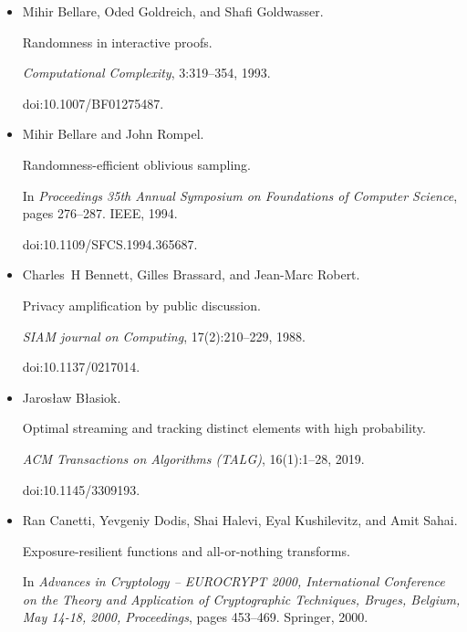 \documentclass[10pt,a4paper]{article}
\begin{document}
\begin{itemize}
\item[] 
[5]

Mihir Bellare, Oded Goldreich, and Shafi Goldwasser.


Randomness in interactive proofs.


\emph{Computational Complexity}, 3:319–354, 1993.


doi:10.1007/BF01275487.





\item[] 
[6]

Mihir Bellare and John Rompel.


Randomness-efficient oblivious sampling.


In \emph{Proceedings 35th Annual Symposium on Foundations of Computer
Science}, pages 276–287. IEEE, 1994.


doi:10.1109/SFCS.1994.365687.





\item[] 
[7]

Charles H Bennett, Gilles Brassard, and Jean-Marc Robert.


Privacy amplification by public discussion.


\emph{SIAM journal on Computing}, 17(2):210–229, 1988.


doi:10.1137/0217014.





\item[] 
[8]

Jarosław Błasiok.


Optimal streaming and tracking distinct elements with high
probability.


\emph{ACM Transactions on Algorithms (TALG)}, 16(1):1–28, 2019.


doi:10.1145/3309193.





\item[] 
[9]

Ran Canetti, Yevgeniy Dodis, Shai Halevi, Eyal Kushilevitz, and Amit Sahai.


Exposure-resilient functions and all-or-nothing transforms.


In \emph{Advances in Cryptology – EUROCRYPT 2000, International
Conference on the Theory and Application of Cryptographic Techniques, Bruges,
Belgium, May 14-18, 2000, Proceedings}, pages 453–469. Springer, 2000.



\end{itemize}
\end{document}
